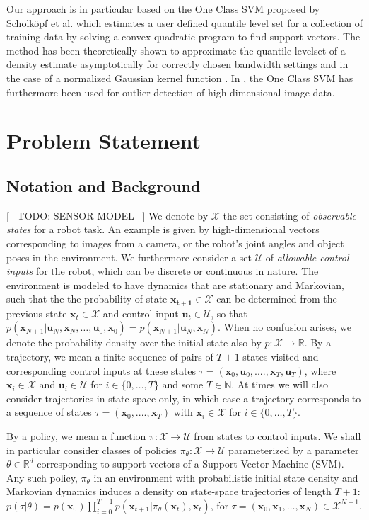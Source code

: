 \documentclass[10pt, conference]{ieeeconf}      %
\newcommand{\bu}{\mathbf{u}}
\newcommand{\bx}{\mathbf{x}}
\begin{document}
Our approach is in particular based on the One Class SVM proposed by Scholk{\"o}pf et al. which estimates a user
defined quantile level set for a collection of training data by solving a convex quadratic program to find support
vectors. The method has been theoretically shown to approximate the quantile levelset of a density estimate
asymptotically for correctly chosen bandwidth settings and in the case of a normalized Gaussian kernel function \cite{vert2006consistency}. 
In \cite{liu2014unsupervised}, the One Class SVM has furthermore been used for outlier detection of high-dimensional 
image data.

\section{Problem Statement}
\subsection{Notation and Background}
{\color{blue} [-- TODO: SENSOR MODEL --]}
We denote by $\mathcal{X}$ the set consisting of \emph{observable states} for a robot task. An example is given by
high-dimensional vectors corresponding to images from a camera, or the robot's joint angles and object poses in the environment.
We furthermore consider a set $\mathcal{U}$ of \emph{allowable control inputs} for the robot, which can be discrete or continuous in
nature. The environment is
modeled to have dynamics that are stationary and Markovian, such that the the probability of state $\mathbf{x_{t+1}}\in
\mathcal{X}$ can be determined from the previous state $\mathbf{x}_t\in\mathcal{X}$ and control input $\mathbf{u}_t\in \mathcal{U}$,
so that $p(\bx_{N+1}|\bu_{N},\bx_{N}, \ldots, \bu_{0}, \bx_{0})=p(\bx_{N+1}|\bu_{N}, \bx_N)$.  
When no confusion arises, we denote the probability density over the initial state also by $p:\mathcal{X}\to
\mathbb{R}$. By a trajectory, we mean a finite sequence of pairs of $T+1$ states visited and corresponding
control inputs at these states $\tau = (\mathbf{x}_0,\mathbf{u}_0, ...., \mathbf{x}_T,\mathbf{u}_T)$, where $\bx_i\in \mathcal{X}$
and $\bu_i\in \mathcal{U}$ for $i\in \{0, \ldots, T\}$ and some $T\in \mathbb{N}$.  
At times we will also consider trajectories in state space only, in which case a trajectory corresponds
to a sequence of states $\tau = (\bx_0,....,\bx_T)$ with $\bx_i\in\mathcal{X}$ for $i\in \{0, \ldots, T\}$.


By a policy, we mean a function $\pi: \mathcal{X} \to \mathcal{U}$ from states to control inputs. 
We shall in particular consider classes of policies $\pi_{\theta}:\mathcal{X}\to \mathcal{U}$ parameterized by a
parameter $\theta\in \mathbb{R}^d$ corresponding to support vectors of a Support Vector Machine (SVM).
Any such policy, $\pi_{\theta}$ in an environment with probabilistic initial state density and Markovian dynamics
induces a density on state-space trajectories of length $T+1$: $p(\tau | \theta)=
p(\bx_0)\prod_{i=0}^{T-1}p(\bx_{t+1}|\pi_{\theta}(\bx_t),\bx_t)$, for $\tau = (\bx_0, \bx_1, \ldots, \bx_N)\in
\mathcal{X}^{N+1}$.
\end{document}
